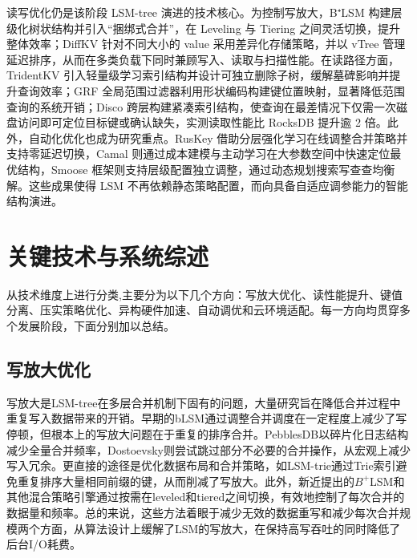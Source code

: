 \documentclass[lang=cn,11pt,a4paper]{elegantpaper}
\begin{document}
	读写优化仍是该阶段 LSM-tree 演进的技术核心。为控制写放大，B⁺LSM 构建层级化树状结构并引入“捆绑式合并”，在 Leveling 与 Tiering 之间灵活切换，提升整体效率\cite{DBLP:conf/hpdc/LiuJWLCY23}；DiffKV 针对不同大小的 value 采用差异化存储策略，并以 vTree 管理延迟排序，从而在多类负载下同时兼顾写入、读取与扫描性能\cite{DBLP:conf/usenix/LiLLWXWTLC21}。在读路径方面，TridentKV 引入轻量级学习索引结构并设计可独立删除子树，缓解墓碑影响并提升查询效率\cite{DBLP:journals/tpds/LuZWFZD22}；GRF 全局范围过滤器利用形状编码构建键位置映射，显著降低范围查询的系统开销\cite{DBLP:journals/pacmmod/WangGYZ24}；Disco 跨层构建紧凑索引结构，使查询在最差情况下仅需一次磁盘访问即可定位目标键或确认缺失，实测读取性能比 RocksDB 提升逾 2 倍\cite{DBLP:journals/pacmmod/ZhongCWE25}。此外，自动化优化也成为研究重点。RusKey 借助分层强化学习在线调整合并策略并支持零延迟切换\cite{DBLP:journals/pacmmod/MoCLS23}，Camal 则通过成本建模与主动学习在大参数空间中快速定位最优结构\cite{DBLP:journals/pacmmod/YuLYC24}，Smoose 框架则支持层级配置独立调整，通过动态规划搜索写查查均衡解\cite{DBLP:journals/pacmmod/LiuWML24}。这些成果使得 LSM 不再依赖静态策略配置，而向具备自适应调参能力的智能结构演进。
	
	\section{关键技术与系统综述}
	
	从技术维度上进行分类,主要分为以下几个方向：写放大优化、读性能提升、键值分离、压实策略优化、异构硬件加速、自动调优和云环境适配。每一方向均贯穿多个发展阶段，下面分别加以总结。
	
	\subsection{写放大优化}
	写放大是LSM-tree在多层合并机制下固有的问题，大量研究旨在降低合并过程中重复写入数据带来的开销。早期的bLSM通过调整合并调度在一定程度上减少了写停顿，但根本上的写放大问题在于重复的排序合并\cite{DBLP:conf/sigmod/SearsR12}。PebblesDB以碎片化日志结构减少全量合并频率\cite{DBLP:conf/sosp/RajuKCA17}，Dostoevsky则尝试跳过部分不必要的合并操作，从宏观上减少写入冗余\cite{DBLP:conf/sigmod/DayanI18}。更直接的途径是优化数据布局和合并策略，如LSM-trie通过Trie索引避免重复排序大量相同前缀的键，从而削减了写放大。此外，新近提出的$B^+$LSM和其他混合策略引擎通过按需在leveled和tiered之间切换，有效地控制了每次合并的数据量和频率\cite{DBLP:conf/hpdc/LiuJWLCY23}。总的来说，这些方法着眼于减少无效的数据重写和减少每次合并规模两个方面，从算法设计上缓解了LSM的写放大，在保持高写吞吐的同时降低了后台I/O耗费。
	
\end{document}
